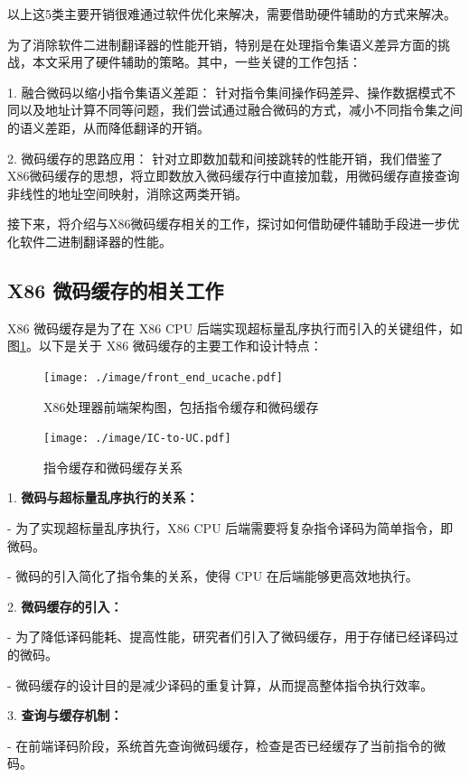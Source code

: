 \documentclass{Style/ucasproposal}%
\begin{document}
以上这5类主要开销很难通过软件优化来解决，需要借助硬件辅助的方式来解决。

为了消除软件二进制翻译器的性能开销，特别是在处理指令集语义差异方面的挑战，本文采用了硬件辅助的策略。其中，一些关键的工作包括：

1. 融合微码以缩小指令集语义差距： 针对指令集间操作码差异、操作数据模式不同以及地址计算不同等问题，我们尝试通过融合微码的方式，减小不同指令集之间的语义差距，从而降低翻译的开销。

2. 微码缓存的思路应用： 针对立即数加载和间接跳转的性能开销，我们借鉴了X86微码缓存的思想，将立即数放入微码缓存行中直接加载，用微码缓存直接查询非线性的地址空间映射，消除这两类开销。

接下来，将介绍与X86微码缓存相关的工作，探讨如何借助硬件辅助手段进一步优化软件二进制翻译器的性能。


\subsection{X86 微码缓存的相关工作}

X86 微码缓存是为了在 X86 CPU 后端实现超标量乱序执行而引入的关键组件，如图\ref{img:front_end_ucache}。以下是关于 X86 微码缓存的主要工作和设计特点：

\begin{figure}[h]
  \centering
  \texttt{[image: ./image/front\_end\_ucache.pdf]}
  \caption{X86处理器前端架构图，包括指令缓存和微码缓存}
  \label{img:front_end_ucache}
\end{figure}

\begin{figure}[h]
  \centering
  \texttt{[image: ./image/IC-to-UC.pdf]}
  \caption{指令缓存和微码缓存关系}
  \label{img:IC_to_UC}
\end{figure}

1. \textbf{微码与超标量乱序执行的关系：}

   - 为了实现超标量乱序执行，X86 CPU 后端需要将复杂指令译码为简单指令，即微码。

   - 微码的引入简化了指令集的关系，使得 CPU 在后端能够更高效地执行。

2. \textbf{微码缓存的引入：}

- 为了降低译码能耗、提高性能，研究者们引入了微码缓存，用于存储已经译码过的微码。

- 微码缓存的设计目的是减少译码的重复计算，从而提高整体指令执行效率。

3. \textbf{查询与缓存机制：}
  
- 在前端译码阶段，系统首先查询微码缓存，检查是否已经缓存了当前指令的微码。
\end{document}
